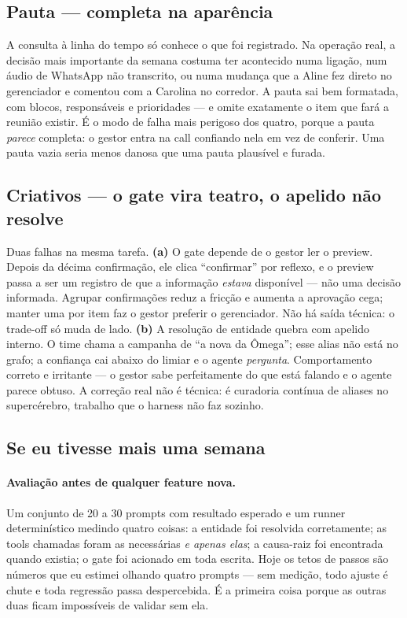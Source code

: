 \documentclass[10pt,twocolumn]{article}
\begin{document}
\subsection{Pauta --- completa na aparência}

A consulta à linha do tempo só conhece o que foi registrado. Na operação real, a decisão
mais importante da semana costuma ter acontecido numa ligação, num áudio de WhatsApp não
transcrito, ou numa mudança que a Aline fez direto no gerenciador e comentou com a Carolina
no corredor. A pauta sai bem formatada, com blocos, responsáveis e prioridades --- e omite
exatamente o item que fará a reunião existir. É o modo de falha mais perigoso dos quatro,
porque a pauta \emph{parece} completa: o gestor entra na call confiando nela em vez de
conferir. Uma pauta vazia seria menos danosa que uma pauta plausível e furada.

\subsection{Criativos --- o gate vira teatro, o apelido não resolve}

Duas falhas na mesma tarefa. \textbf{(a)} O gate depende de o gestor ler o preview. Depois da
décima confirmação, ele clica ``confirmar'' por reflexo, e o preview passa a ser um registro
de que a informação \emph{estava} disponível --- não uma decisão informada. Agrupar
confirmações reduz a fricção e aumenta a aprovação cega; manter uma por item faz o gestor
preferir o gerenciador. Não há saída técnica: o trade-off só muda de lado. \textbf{(b)} A
resolução de entidade quebra com apelido interno. O time chama a campanha de ``a nova da
Ômega''; esse alias não está no grafo; a confiança cai abaixo do limiar e o agente
\emph{pergunta}. Comportamento correto e irritante --- o gestor sabe perfeitamente do que
está falando e o agente parece obtuso. A correção real não é técnica: é curadoria contínua
de aliases no supercérebro, trabalho que o harness não faz sozinho.

\subsection{Se eu tivesse mais uma semana}

\paragraph{Avaliação antes de qualquer feature nova.} Um conjunto de 20 a 30 prompts com
resultado esperado e um runner determinístico medindo quatro coisas: a entidade foi
resolvida corretamente; as tools chamadas foram as necessárias \emph{e apenas elas}; a
causa-raiz foi encontrada quando existia; o gate foi acionado em toda escrita. Hoje os tetos
de passos são números que eu estimei olhando quatro prompts --- sem medição, todo ajuste é
chute e toda regressão passa despercebida. É a primeira coisa porque as outras duas ficam
impossíveis de validar sem ela.
\end{document}
